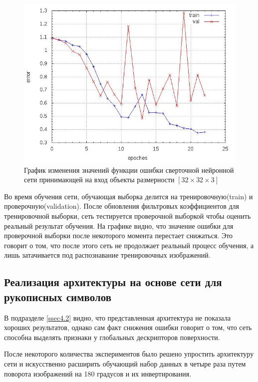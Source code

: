 \documentclass[14pt]{article}
\numberwithin{figure}{section}
\numberwithin{equation}{section}
\begin{document}
\begin{figure}[h]
   \begin{center}
       \includegraphics[scale=0.7] {10.JPG}
       \caption{График изменения значений функции ошибки сверточной нейронной сети принимающей на вход объекты размерности $[32 \times 32 \times 3]$}
       \label{ris:10}
   \end{center}
\end{figure}

Во время обучения сети, обучающая выборка делится на тренировочную(train) и проверочную(validation). После обновления фильтровых коэффициентов для тренировочной выборки, сеть тестируется проверочной выборкой чтобы оценить реальный результат обучения. На графике видно, что значение ошибки для проверочной выборки после некоторого момента перестает снижаться. Это говорит о том, что после этого сеть не продолжает реальный процесс обучения, а лишь затачивается под распознавание тренировочных изображений.

\subsection{Реализация архитектуры на основе сети для рукописных символов}

В подразделе \ref{ssec4.2} видно, что представленная архитектура не показала хороших результатов, однако сам факт снижения ошибки говорит о том, что сеть способна выделять признаки у глобальных дескрипторов поверхности.

После некоторого количества экспериментов было решено упростить архитектуру сети и искусственно расширить обучающий набор данных в четыре раза путем поворота изображений на 180 градусов и их инвертирования.
\end{document}

